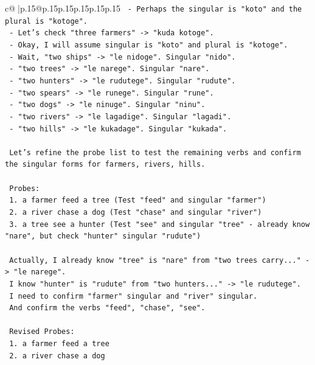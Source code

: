 \documentclass{article}
\begin{document}
{\begin{supertabular}{c@{$\;$}|p{.15\linewidth}@{}p{.15\linewidth}p{.15\linewidth}p{.15\linewidth}p{.15\linewidth}p{.15\linewidth}}
{{{\texttt{      {-} Perhaps the singular is "koto" and the plural is "kotoge".} \\
\texttt{      {-} Let's check "three farmers" {-}> "kuda kotoge".} \\
\texttt{      {-} Okay, I will assume singular is "koto" and plural is "kotoge".} \\
\texttt{      {-} Wait, "two ships" {-}> "le nidoge". Singular "nido".} \\
\texttt{      {-} "two trees" {-}> "le narege". Singular "nare".} \\
\texttt{      {-} "two hunters" {-}> "le rudutege". Singular "rudute".} \\
\texttt{      {-} "two spears" {-}> "le runege". Singular "rune".} \\
\texttt{      {-} "two dogs" {-}> "le ninuge". Singular "ninu".} \\
\texttt{      {-} "two rivers" {-}> "le lagadige". Singular "lagadi".} \\
\texttt{      {-} "two hills" {-}> "le kukadage". Singular "kukada".} \\
\\ 
\texttt{    Let's refine the probe list to test the remaining verbs and confirm the singular forms for farmers, rivers, hills.} \\
\\ 
\texttt{    Probes:} \\
\texttt{    1. a farmer feed a tree (Test "feed" and singular "farmer")} \\
\texttt{    2. a river chase a dog (Test "chase" and singular "river")} \\
\texttt{    3. a tree see a hunter (Test "see" and singular "tree" {-} already know "nare", but check "hunter" singular "rudute")} \\
\\ 
\texttt{    Actually, I already know "tree" is "nare" from "two trees carry..." {-}> "le narege".} \\
\texttt{    I know "hunter" is "rudute" from "two hunters..." {-}> "le rudutege".} \\
\texttt{    I need to confirm "farmer" singular and "river" singular.} \\
\texttt{    And confirm the verbs "feed", "chase", "see".} \\
\\ 
\texttt{    Revised Probes:} \\
\texttt{    1. a farmer feed a tree} \\
\texttt{    2. a river chase a dog} \\
}}}
\end{supertabular}}
\end{document}
